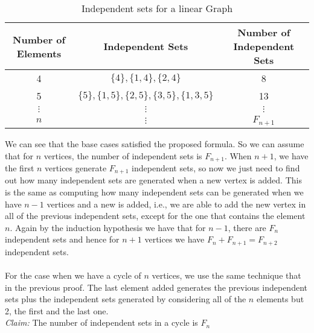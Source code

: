 \documentclass[tikz, 12pt]{scrartcl}
\begin{document}
\begin{enumerate}
\begin{longtable}{|c|c|c|}
\caption{Independent sets for a linear Graph\label{advancedLinearGraph}}\\
\hline
Number of Elements	&	Independent Sets	&	Number of Independent Sets\\
\hline
	4			&	$\{4\}, \{1, 4\}, \{2,4\}$				&	8	\\
	5			&	$\{5\}, \{1, 5\}, \{2, 5\}, \{3, 5\}, \{1, 3, 5\}$	&	13 \\
	$\vdots$		&	$\vdots$							&	$\vdots$\\
	$n$			&	$\vdots$							&	$F_{n + 1}	$\\
\hline
\end{longtable}	 

We can see that the base cases satisfied the proposed formula. So we can assume that for $n$ vertices, the number of independent sets is $F_{n + 1}$. When $n + 1$, we have the first $n$ vertices generate $F_{n + 1}$ independent sets, so now we just need to find out how many independent sets are generated when a new vertex is added. This is the same as computing how many independent sets can be generated when we have $n - 1$ vertices and a new is added, i.e., we are able to add the new vertex in all of the previous independent sets, except for the one that contains the element $n$. Again by the induction hypothesis we have that for $n- 1$, there are $F_{n}$ independent sets and hence for $n + 1$ vertices we have $F_{n} + F_{n + 1} = F_{n + 2}$ independent sets.\\
\\
For the case when we have a cycle of $n$ vertices, we use the same technique that in the previous proof. The last element added generates the previous independent sets plus the independent sets generated by considering all of the $n$ elements but 2, the first and the last one.\\
\textit{Claim:} The number of independent sets in a cycle is $F_{n} $
	

\end{enumerate}
\end{document}
